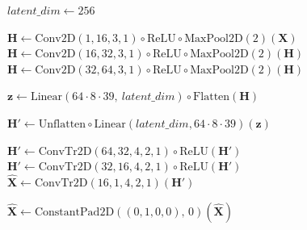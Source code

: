 \documentclass{article}
\begin{document}
\begin{algorithm}[H]
\caption{Convolutional Autoencoder with Constant Padding}

\DontPrintSemicolon

$\textit{latent\_dim} \leftarrow 256$\;

\BlankLine
$\mathbf H \leftarrow \mathrm{Conv2D}(1,16,3,1)\!\circ\!\mathrm{ReLU}\!\circ\!\mathrm{MaxPool2D}(2)(\mathbf X)$\;
$\mathbf H \leftarrow \mathrm{Conv2D}(16,32,3,1)\!\circ\!\mathrm{ReLU}\!\circ\!\mathrm{MaxPool2D}(2)(\mathbf H)$\;
$\mathbf H \leftarrow \mathrm{Conv2D}(32,64,3,1)\!\circ\!\mathrm{ReLU}\!\circ\!\mathrm{MaxPool2D}(2)(\mathbf H)$

\BlankLine
$\mathbf z \leftarrow \mathrm{Linear}(64\!\cdot\!8\!\cdot\!39,\ \textit{latent\_dim})\!\circ\!\mathrm{Flatten}(\mathbf H)$\;

\BlankLine
$\mathbf H' \leftarrow \mathrm{Unflatten}\!\circ\!\mathrm{Linear}(\textit{latent\_dim},64\!\cdot\!8\!\cdot\!39)(\mathbf z)$\;

\BlankLine
$\mathbf H' \leftarrow \mathrm{ConvTr2D}(64,32,4,2,1)\!\circ\!\mathrm{ReLU}(\mathbf H')$\;
$\mathbf H' \leftarrow \mathrm{ConvTr2D}(32,16,4,2,1)\!\circ\!\mathrm{ReLU}(\mathbf H')$\;
$\hat{\mathbf X} \leftarrow \mathrm{ConvTr2D}(16,1,4,2,1)(\mathbf H')$\;

\BlankLine
$\hat{\mathbf X} \leftarrow \mathrm{ConstantPad2D}((0,1,0,0),\,0)(\hat{\mathbf X})$\;

\end{algorithm}
\end{document}
